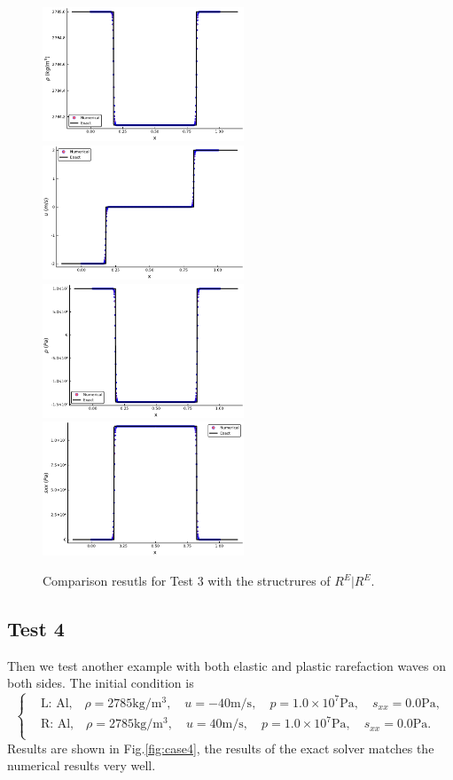\documentclass[review]{elsarticle}
\begin{document}
\begin{figure}
  \centering

  \includegraphics[width= 6cm] {case4rho.pdf}
  \includegraphics[width= 6cm] {case4u.pdf}
  \includegraphics[width= 6cm] {case4p.pdf}
  \includegraphics[width= 6cm] {case4sxx.pdf}

    \caption{Comparison resutls for Test 3 with the structrures of $R^E|R^E$.  }
  \label{fig:case3}
\end{figure}
\subsection{Test 4}
Then we test another example with both elastic and plastic rarefaction  waves on both sides. The initial condition is
\begin{equation}
 \left\{ \begin{aligned}
	 &	 \text{L: Al,}\quad  \rho = 2785 \text{kg}/\text{m}^3, \quad  u = -40\text{m}/\text{s}, \quad  p = 1.0\times 10^7 \text{Pa}, \quad  s_{xx}=0.0 \text{Pa},\\
	 &	 \text{R: Al,}\quad  \rho = 2785 \text{kg}/\text{m}^3, \quad  u = 40\text{m}/\text{s}, \quad  p = 1.0\times 10^7\text{Pa}, \quad  s_{xx}=0.0 \text{Pa}.\\
   \end{aligned}
 \right.
\end{equation}
Results are shown in Fig.\ref{fig:case4},  the results of the exact solver matches the numerical results very well.
\end{document}
